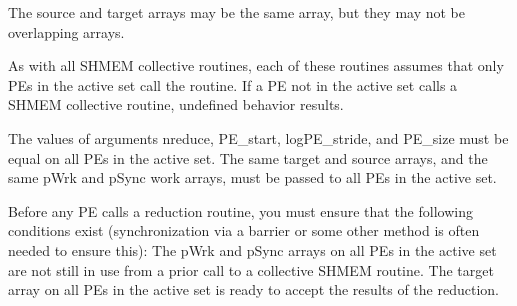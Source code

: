 {{{ The source and target arrays may be the same array, but they may not be
 overlapping arrays.

 As with all SHMEM collective routines, each of these routines assumes
 that only \ac{PE}s in the active set call the routine. If a \ac{PE} not in the
 active set calls a SHMEM collective	 routine, undefined behavior
 results.

 
 The values of arguments nreduce, PE\_start, logPE\_stride, and PE\_size
 must be equal on all \ac{PE}s in the active set. The same target and source
 arrays, and the same pWrk and pSync work arrays, must be passed to all
 \ac{PE}s in the active set.

 Before any \ac{PE}	calls a reduction routine, you must ensure that the
 following conditions exist (synchronization via a barrier or some other
 method is often needed to ensure this): The pWrk and pSync arrays on
 all \ac{PE}s in the active set are not still in use from a prior call	 to a
 collective SHMEM routine. The target array on all \ac{PE}s in the active
 set is ready to accept the results of the reduction.

}}}
